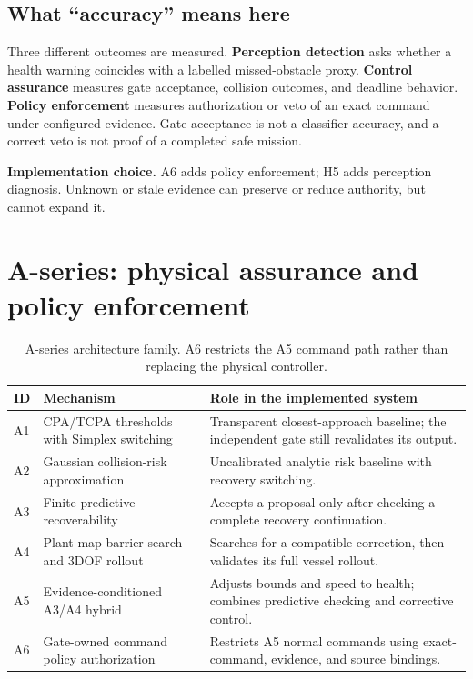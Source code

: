 \documentclass[sigconf,nonacm]{acmart}
\newcommand{\callout}[1]{\par\vspace{4pt}\noindent\colorbox{pale}{\parbox{\dimexpr\linewidth-2\fboxsep\relax}{\small #1}}\par\vspace{4pt}}
\begin{document}
\subsection{What ``accuracy'' means here}
Three different outcomes are measured. \textbf{Perception detection} asks whether a health warning coincides with a labelled missed-obstacle proxy. \textbf{Control assurance} measures gate acceptance, collision outcomes, and deadline behavior. \textbf{Policy enforcement} measures authorization or veto of an exact command under configured evidence. Gate acceptance is not a classifier accuracy, and a correct veto is not proof of a completed safe mission.

\callout{\textbf{Implementation choice.} A6 adds policy enforcement; H5 adds perception diagnosis. Unknown or stale evidence can preserve or reduce authority, but cannot expand it.}




\section{A-series: physical assurance and policy enforcement}
\begin{table}[t]
\centering\small
\caption{A-series architecture family. A6 restricts the A5 command path rather than replacing the physical controller.}
\label{tab:architectures}
\begin{tabularx}{\textwidth}{@{}p{0.35in}p{2.4in}X@{}}
\toprule
\textbf{ID} & \textbf{Mechanism} & \textbf{Role in the implemented system}\\
\midrule
A1 & CPA/TCPA thresholds with Simplex switching & Transparent closest-approach baseline; the independent gate still revalidates its output.\\
A2 & Gaussian collision-risk approximation & Uncalibrated analytic risk baseline with recovery switching.\\
A3 & Finite predictive recoverability & Accepts a proposal only after checking a complete recovery continuation.\\
A4 & Plant-map barrier search and 3DOF rollout & Searches for a compatible correction, then validates its full vessel rollout.\\
A5 & Evidence-conditioned A3/A4 hybrid & Adjusts bounds and speed to health; combines predictive checking and corrective control.\\
A6 & Gate-owned command policy authorization & Restricts A5 normal commands using exact-command, evidence, and source bindings.\\
\bottomrule
\end{tabularx}
\end{table}
\end{document}
